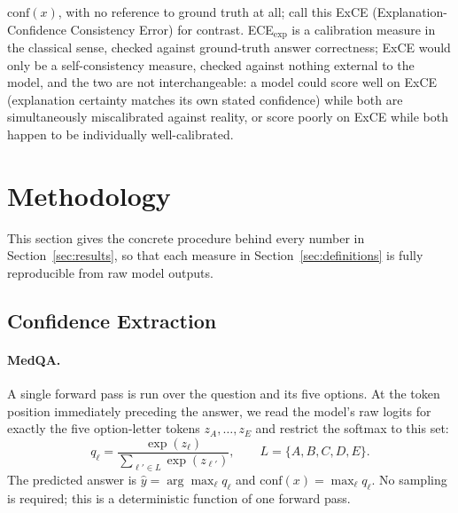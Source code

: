\documentclass[letterpaper]{article} %
\begin{document}
$\text{conf}(x)$, with no reference to ground truth at all; call this ExCE (Explanation-Confidence Consistency Error) for contrast. ECE$_{\text{exp}}$ is a calibration measure in the classical sense, checked against ground-truth answer correctness; ExCE would only be a self-consistency measure, checked against nothing external to the model, and the two are not interchangeable: a model could score well on ExCE (explanation certainty matches its own stated confidence) while both are simultaneously miscalibrated against reality, or score poorly on ExCE while both happen to be individually well-calibrated.

\section{Methodology} \label{sec:methodology} This section gives the concrete procedure behind every number in Section~\ref{sec:results}, so that each measure in Section~\ref{sec:definitions} is fully reproducible from raw model outputs.

\subsection{Confidence Extraction} \label{sec:conf-extraction} \paragraph{MedQA.} A single forward pass is run over the question and its five options. At the token position immediately preceding the answer, we read the model's raw logits for exactly the five option-letter tokens $z_A,\ldots,z_E$ and restrict the softmax to this set: \[ q_\ell = \frac{\exp(z_\ell)}{\sum_{\ell'\in L}\exp(z_{\ell'})}, \qquad L=\{A,B,C,D,E\}. \] The predicted answer is $\hat y = \arg\max_\ell q_\ell$ and $\text{conf}(x) = \max_\ell q_\ell$. No sampling is required; this is a deterministic function of one forward pass. 
\end{document}
